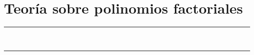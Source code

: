 \pagestyle{plain}
\chapter{Teoría sobre polinomios factoriales}\label{app:ApendiceII}
\vspace{0.2cm}
\noindent\rule{\linewidth}{1.5pt}\\
\startcontents[chapters]
\vspace{0.2cm}
\noindent\rule{\linewidth}{1.3pt}\\
\newpage
